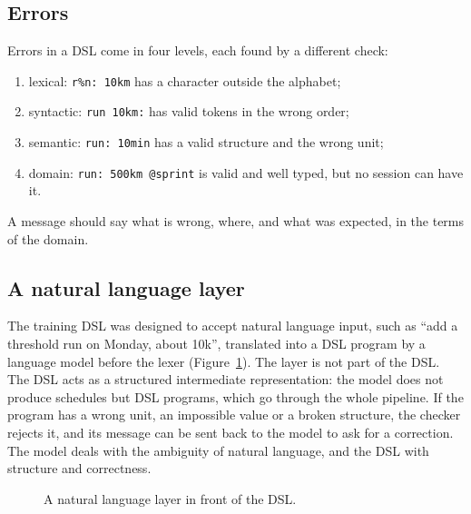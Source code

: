 \subsection{Errors}

Errors in a DSL come in four levels, each found by a different check:
\begin{enumerate}
  \item lexical: \texttt{r\%n: 10km} has a character outside the alphabet;
  \item syntactic: \texttt{run 10km:} has valid tokens in the wrong order;
  \item semantic: \texttt{run: 10min} has a valid structure and the wrong unit;
  \item domain: \texttt{run: 500km @sprint} is valid and well typed, but no
    session can have it.
\end{enumerate}
A message should say what is wrong, where, and what was expected, in the terms
of the domain.

\subsection{A natural language layer}

The training DSL was designed to accept natural language input, such as
``add a threshold run on Monday, about 10k'', translated into a DSL program by
a language model before the lexer (Figure~\ref{fig:nl-layer}). The layer is
not part of the DSL. The DSL acts as a structured intermediate representation:
the model does not produce schedules but DSL programs, which go through the
whole pipeline. If the program has a wrong unit, an impossible value or a
broken structure, the checker rejects it, and its message can be sent back to
the model to ask for a correction. The model deals with the ambiguity of
natural language, and the DSL with structure and correctness.

\begin{figure}[h]
\centering
{}
\caption{A natural language layer in front of the DSL.}
\label{fig:nl-layer}
\end{figure}

